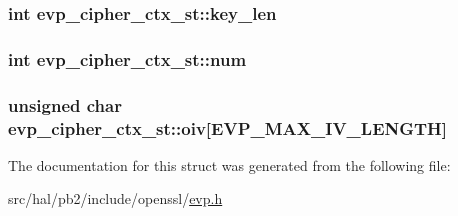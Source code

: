\subsubsection[{\texorpdfstring{key\+\_\+len}{key_len}}]{\setlength{\rightskip}{0pt plus 5cm}int evp\+\_\+cipher\+\_\+ctx\+\_\+st\+::key\+\_\+len}\hypertarget{structevp__cipher__ctx__st_a61064bef0c7565f3509f8d48f253637d}{}\label{structevp__cipher__ctx__st_a61064bef0c7565f3509f8d48f253637d}
\subsubsection[{\texorpdfstring{num}{num}}]{\setlength{\rightskip}{0pt plus 5cm}int evp\+\_\+cipher\+\_\+ctx\+\_\+st\+::num}\hypertarget{structevp__cipher__ctx__st_ae09b6c40179528583d8d7b3cc623bd87}{}\label{structevp__cipher__ctx__st_ae09b6c40179528583d8d7b3cc623bd87}
\subsubsection[{\texorpdfstring{oiv}{oiv}}]{\setlength{\rightskip}{0pt plus 5cm}unsigned char evp\+\_\+cipher\+\_\+ctx\+\_\+st\+::oiv\mbox{[}{\bf E\+V\+P\+\_\+\+M\+A\+X\+\_\+\+I\+V\+\_\+\+L\+E\+N\+G\+TH}\mbox{]}}\hypertarget{structevp__cipher__ctx__st_a9b3a75184a5f5d29fbccf925503fe302}{}\label{structevp__cipher__ctx__st_a9b3a75184a5f5d29fbccf925503fe302}


The documentation for this struct was generated from the following file\+:\begin{DoxyCompactItemize}
\item 
src/hal/pb2/include/openssl/\hyperlink{evp_8h}{evp.\+h}\end{DoxyCompactItemize}
